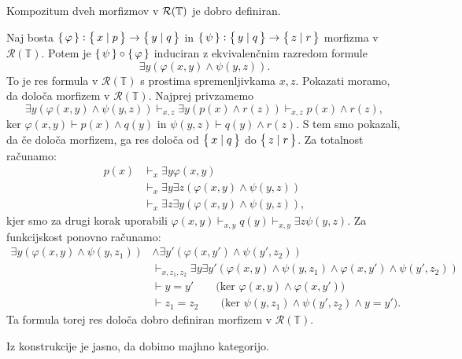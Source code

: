 \documentclass[../kategoricna_logika.tex]{subfiles}
\begin{document}
  \begin{lema}
    Kompozitum dveh morfizmov v $\mathcal{R}(\mathbb{T})$ je dobro definiran.
  \end{lema}
  \begin{dokaz}
    Naj bosta $\left\lbrace\,\varphi\,\right\rbrace : \left\lbrace\,x \mid p\,\right\rbrace \to \left\lbrace\,y \mid q\,\right\rbrace$ in
    $\left\lbrace\,\psi\,\right\rbrace : \left\lbrace\,y \mid q\,\right\rbrace \to \left\lbrace\,z \mid r\,\right\rbrace$ morfizma v
    $\mathcal{R}(\mathbb{T})$.  Potem je
    $\left\lbrace\,\psi\,\right\rbrace \circ \left\lbrace\,\varphi\,\right\rbrace$ induciran z ekvivalenčnim
    razredom formule
    \[ \exists y(\varphi(x,y) \land \psi(y,z)). \] To je res formula v
    $\mathcal{R}(\mathbb{T})$ s prostima spremenljivkama $x, z$.
    Pokazati moramo, da določa morfizem v
    $\mathcal{R}(\mathbb{T})$. Najprej privzamemo
    \[ \exists y(\varphi(x,y) \land \psi(y,z)) \vdash_{x,z}\exists
      y(p(x) \land r(z)) \vdash_{x,z}p(x) \land r(z), \] ker
    $\varphi(x,y) \vdash p(x) \land q(y)$ in
    $\psi(y,z) \vdash q(y) \land r(z)$.  S tem smo pokazali, da če
    določa morfizem, ga res določa od $\left\lbrace\,x \mid q\,\right\rbrace$ do
    $\left\lbrace\,z \mid r\,\right\rbrace$.  Za totalnost računamo:
    \begin{align*}
      p(x) &\vdash_{x} \exists y \varphi(x,y) \\
           &\vdash_{x} \exists y \exists z (\varphi(x,y) \land \psi(y,z)) \\
           &\vdash_{x} \exists z \exists y(\varphi(x,y) \land \psi(y,z)),
    \end{align*}
    kjer smo za drugi korak uporabili
    $\varphi(x,y) \vdash_{x,y} q(y) \vdash_{x,y} \exists z \psi(y,z)$.
    Za funk\-cij\-skost ponovno računamo:
    \begin{align*}
      \exists y(\varphi(x,y) \land \psi(y,z_{1})) &\land \exists y' (\varphi(x,y') \land \psi(y',z_{2})) \\
                                                  &\vdash_{x,z_{1}, z_{2}} \exists y \exists y' (\varphi(x,y) \land \psi(y,z_{1}) \land \varphi(x,y') \land \psi(y',z_{2})) \\
                                                  &\vdash y = y' \qquad \text{(ker $\varphi(x,y) \land \varphi(x,y')$)} \\
                                                  &\vdash z_{1} = z_{2} \qquad \text{(ker $\psi(y,z_{1}) \land \psi(y',z_{2}) \land y=y'$)}.
    \end{align*}
    Ta formula torej res določa dobro definiran morfizem v
    $\mathcal{R}(\mathbb{T})$.
  \end{dokaz}
  \begin{opomba}
    Iz konstrukcije je jasno, da dobimo majhno kategorijo.
  \end{opomba}
\end{document}
